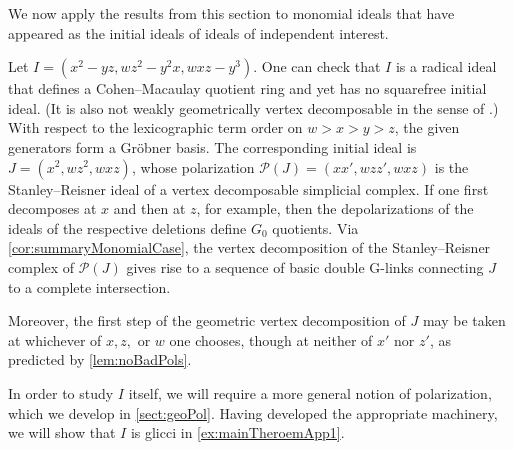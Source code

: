 \documentclass[12pt, reqno]{amsart}
\numberwithin{equation}{section}
\newtheorem{Main Conjecture}[theorem]{Main Conjecture}
\theoremstyle{definition}
\newenvironment{example}
  {\pushQED{\qed}\renewcommand{\qedsymbol}{$\diamondsuit$}\examplex}
  {\popQED\endexamplex}
\theoremstyle{plain}
\renewcommand{\P}{\mathcal{P}}
\begin{document}
  
We now apply the results from this section to monomial ideals that have appeared as the initial ideals of ideals of independent interest.  

\begin{example}\label{ex:manySquares}
Let $I = (x^2-yz,wz^2-y^2x,wxz-y^3)$. One can check that $I$ is a radical ideal that defines a Cohen--Macaulay quotient ring and yet has no squarefree initial ideal. (It is also not weakly geometrically vertex decomposable in the sense of \cite[Definition 4.6]{KR21}.)  With respect to the lexicographic term order on $w>x>y>z$, the given generators form a Gr\"obner basis.  The corresponding initial ideal is $J = (x^2,wz^2,wxz)$, whose polarization $\P(J)=(xx',wzz',wxz)$ is the Stanley--Reisner ideal of a vertex decomposable simplicial complex.  If one first decomposes at $x$ and then at $z$, for example, then the depolarizations of the ideals of the respective deletions define $G_0$ quotients.  Via \cref{cor:summaryMonomialCase}, the vertex decomposition of the Stanley--Reisner complex of $\P(J)$ gives rise to a sequence of basic double G-links connecting $J$ to a complete intersection.  

Moreover, the first step of the geometric vertex decomposition of $J$ may be taken at whichever of $x,z,$ or $w$ one chooses, though at neither of $x'$ nor $z'$, as predicted by \cref{lem:noBadPols}.

In order to study $I$ itself, we will require a more general notion of polarization, which we develop in \cref{sect:geoPol}.  Having developed the appropriate machinery, we will show that $I$ is glicci in \cref{ex:mainTheroemApp1}.
\end{example}
\end{document}
